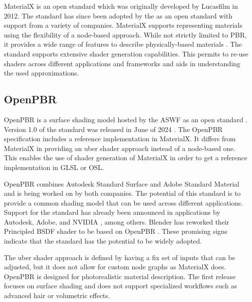 \gls{MaterialX} is an open standard which was originally developed by Lucasfilm in 2012. The standard has since been adopted by the  as an open standard with support from a variety of companies. \gls{MaterialX} supports representing materials using the flexibility of a node-based approach. While not strictly limited to \gls{PBR}, it provides a wide range of features to describe physically-based materials \cite{Harrysson2019}. The standard supports extensive shader generation capabilities. This permits to re-use shaders across different applications and frameworks and aids in understanding the used approximations.

\subsection*{OpenPBR}

\gls{OpenPBR} is a surface shading model hosted by the \gls{ASWF} as an open standard \cite{openPBRSpec}. Version 1.0 of the standard was released in June of 2024 \cite{openPBR1Dot0Release}. The \gls{OpenPBR} specification includes a reference implementation in \gls{MaterialX}. It differs from \gls{MaterialX} in providing an \gls{uber shader} approach instead of a node-based one. This enables the use of shader generation of \gls{MaterialX} in order to get a reference implementation in \gls{GLSL} or \gls{OSL}.

\gls{OpenPBR} combines Autodesk Standard Surface and Adobe Standard Material and is being worked on by both companies. The potential of this standard is to provide a common shading model that can be used across different applications. Support for the standard has already been announced in applications by Autodesk, Adobe, and NVIDIA \cite{omniverseOpenPBR}, among others. \gls{Blender} has reworked their Principled \gls{BSDF} shader to be based on \gls{OpenPBR} \cite{blenderOpenPBRInspiration}. These promising signs indicate that the standard has the potential to be widely adopted.

The \gls{uber shader} approach is defined by having a fix set of inputs that can be adjusted, but it does not allow for custom node graphs as \gls{MaterialX} does. \gls{OpenPBR} is designed for photorealistic material description. The first release focuses on surface shading and does not support specialized workflows such as advanced hair or volumetric effects.

